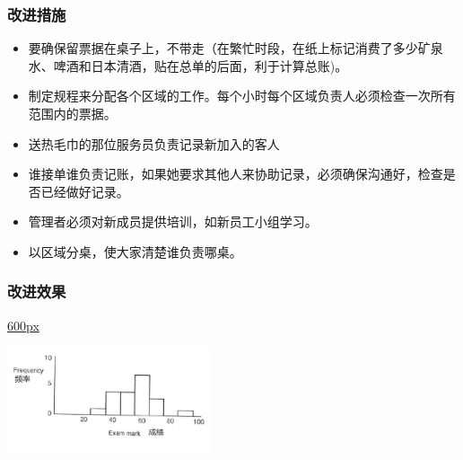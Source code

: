 \hypertarget{ux6539ux8fdbux63aaux65bd}{%
\subsubsection{改进措施}\label{ux6539ux8fdbux63aaux65bd}}

\begin{itemize}
\tightlist
\item
  要确保留票据在桌子上，不带走（在繁忙时段，在纸上标记消费了多少矿泉水、啤酒和日本清酒，贴在总单的后面，利于计算总账)。
\end{itemize}



\begin{itemize}
\tightlist
\item
  制定规程来分配各个区域的工作。每个小时每个区域负责人必须检查一次所有范围内的票据。
\end{itemize}

\begin{itemize}
\tightlist
\item
  送热毛巾的那位服务员负责记录新加入的客人
\end{itemize}

\begin{itemize}
\tightlist
\item
  谁接单谁负责记账，如果她要求其他人来协助记录，必须确保沟通好，检查是否已经做好记录。
\end{itemize}

\begin{itemize}
\tightlist
\item
  管理者必须对新成员提供培训，如新员工小组学习。
\end{itemize}

\begin{itemize}
\tightlist
\item
  以区域分桌，使大家清楚谁负责哪桌。
\end{itemize}

\hypertarget{ux6539ux8fdbux6548ux679c}{%
\subsubsection{改进效果}\label{ux6539ux8fdbux6548ux679c}}

\href{文件:club19.1.jpg}{600px}

\includegraphics[width=6cm]{MA_FA1_10.png}

